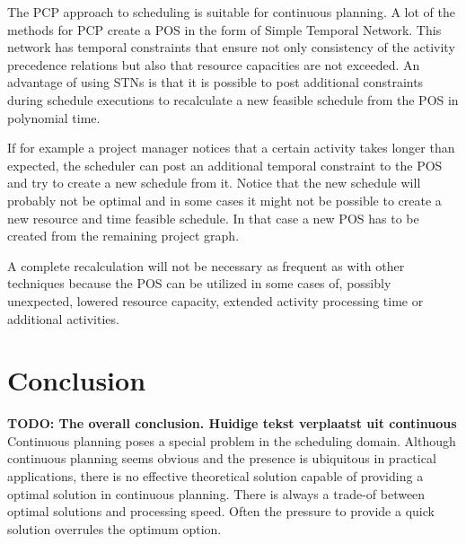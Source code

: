 \documentclass{article}
\newcommand{\TODO}[1]{{\color{red}\textbf{TODO: #1}}}
\begin{document}
The PCP approach to scheduling is suitable for continuous planning. A lot of the methods for PCP create a POS in the form of Simple Temporal Network. This network has temporal constraints that ensure not only consistency of the activity precedence relations but also that resource capacities are not exceeded. An advantage of using STNs is that it is possible to post additional constraints during schedule executions to recalculate a new feasible schedule from the POS in polynomial time.

If for example a project manager notices that a certain activity takes longer than expected, the scheduler can post an additional temporal constraint to the POS and try to create a new schedule from it. Notice that the new schedule will probably not be optimal and in some cases it might not be possible to create a new resource and time feasible schedule. In that case a new POS has to be created from the remaining project graph. 

A complete recalculation will not be necessary as frequent as with other techniques because the POS can be utilized in some cases of, possibly unexpected, lowered resource capacity, extended activity processing time or additional activities. 

\newpage

\section{Conclusion}
\TODO{The overall conclusion. Huidige tekst verplaatst uit continuous}
Continuous planning poses a special problem in the scheduling domain.
Although continuous planning seems obvious and the presence is ubiquitous in practical applications, there is no effective theoretical solution capable of providing a optimal solution in continuous planning.
There is always a trade-of between optimal solutions and processing speed.
Often the pressure to provide a quick solution overrules the optimum option.

\newpage


\end{document}
